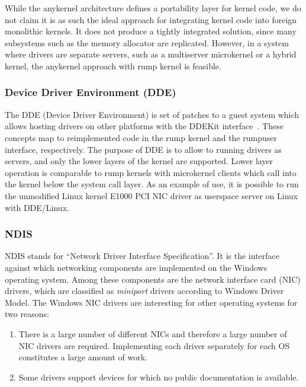 While the anykernel architecture defines a portability layer for
kernel code, we do not claim it is as such the ideal approach for
integrating kernel code into foreign monolithic kernels.  It does
not produce a tightly integrated solution, since many subsystems
such as the memory allocator are replicated.  However, in a system
where drivers are separate servers, such as a multiserver microkernel
or a hybrid kernel, the anykernel approach with rump kernel is feasible.

\subsubsection*{Device Driver Environment (DDE)}

The DDE (Device Driver Environment) is set of patches to a guest
system which allows hosting drivers on other platforms with the
DDEKit interface~\cite{ddekitwiki}.  These concepts map to
reimplemented code in the rump kernel and the rumpuser interface,
respectively.  The purpose of DDE is to allow to running drivers as
servers, and only the lower layers of the kernel are supported.
Lower layer operation is comparable to rump kernels with microkernel
clients which call into the kernel below the system call layer.  As
an example of use, it is possible to run the unmodified Linux kernel
E1000 PCI NIC driver as userspace server on
Linux~\cite{weisbach:ddekit} with DDE/Linux.

\subsubsection*{NDIS}

NDIS stands for ``Network Driver Interface Specification''.  It is
the interface against which networking components are implemented on
the Windows operating system.  Among these components are the
network interface card (NIC) drivers, which are classified as
\textit{miniport} drivers according to Windows Driver Model.  The
Windows NIC drivers are interesting for other operating systems for
two reasons:

\begin{enumerate}
\item	There is a large number of different NICs and therefore a
	large number of NIC drivers are required.  Implementing each
	driver separately for each OS constitutes a large amount of
	work.

\item	Some drivers support devices for which no public
	documentation is available.
\end{enumerate}

